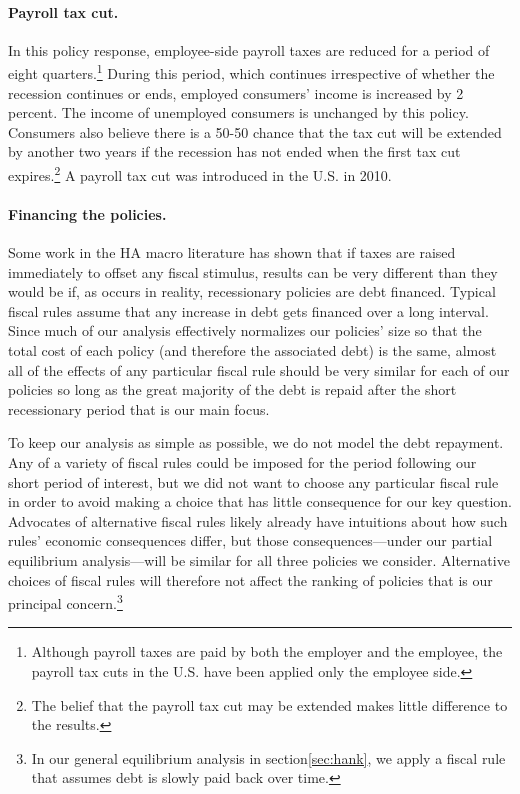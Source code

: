 \documentclass[\econtexRoot/HAFiscal]{subfiles}
\begin{document}
\paragraph{Payroll tax cut.} In this policy response, employee-side payroll taxes are reduced for a period of eight quarters.\footnote{Although payroll taxes are paid by both the employer and the employee, the payroll tax cuts in the U.S. have been applied only the employee side.} During this period, which continues irrespective of whether the recession continues or ends, employed consumers' income is increased by 2 percent. The income of unemployed consumers is unchanged by this policy. Consumers also believe there is a 50-50 chance that the tax cut will be extended by another two years if the recession has not ended when the first tax cut expires.\footnote{The belief that the payroll tax cut may be extended makes little difference to the results.} A payroll tax cut was introduced in the U.S. in 2010.

\paragraph{Financing the policies.} Some work in the HA macro literature has shown that if taxes are raised immediately to offset any fiscal stimulus, results can be very different than they would be if, as occurs in reality, recessionary policies are debt financed.  Typical fiscal rules assume that any increase in debt gets financed over a long interval.  Since much of our analysis effectively normalizes our policies' size so that the total cost of each policy (and therefore the associated debt) is the same, almost all of the effects of any particular fiscal rule should be very similar for each of our policies so long as the great majority of the debt is repaid after the short recessionary period that is our main focus.

To keep our analysis as simple as possible, we do not model the debt repayment.  Any of a variety of fiscal rules could be imposed for the period following our short period of interest, but we did not want to choose any particular fiscal rule in order to avoid making a choice that has little consequence for our key question. Advocates of alternative fiscal rules likely already have intuitions about how such rules' economic consequences differ, but those consequences---under our partial equilibrium analysis---will be similar for all three policies we consider.  Alternative choices of fiscal rules will therefore not affect the ranking of policies that is our principal concern.\footnote{In our general equilibrium analysis in section\ref{sec:hank}, we apply a fiscal rule that assumes debt is slowly paid back over time.}
\end{document}
